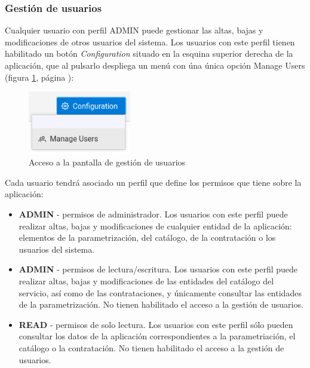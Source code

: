  
 
\subsubsection{Gestión de usuarios}
\label{sub:gestion-usuarios}

Cualquier usuario con perfil ADMIN puede gestionar las altas, bajas y modificaciones de otros usuarios del sistema. Los usuarios con este perfil tienen habilitado un botón \emph{Configuration} situado en la esquina superior derecha de la aplicación, que al pulsarlo despliega un menú con úna única opción Manage Users (figura \ref{fig:boton-gestion-usuarios}, página \pageref{fig:boton-gestion-usuarios}):

\begin{figure}[H]
  \centering
  \includegraphics[width=0.40\textwidth]{imaxes/gestion-usuarios-01.png}
  \caption{Acceso a la pantalla de gestión de usuarios}
  \label{fig:boton-gestion-usuarios}
\end{figure}


Cada usuario tendrá asociado un perfil que define los permisos que tiene sobre la aplicación:

\begin{itemize}
\item \textbf{ADMIN} - permisos de administrador. Los usuarios con este perfil puede realizar altas, bajas y modificaciones de cualquier entidad de la aplicación: elementos de la parametrización, del catálogo, de la contratación o los usuarios del sistema.
\item \textbf{ADMIN} - permisos de lectura/escritura. Los usuarios con este perfil puede realizar altas, bajas y modificaciones de las entidades del catálogo del servicio, así como de las contrataciones, y únicamente consultar las entidades de la parametrización. No tienen habilitado el acceso a la gestión de usuarios.
\item \textbf{READ} - permisos de solo lectura. Los usuarios con este perfil sólo pueden consultar los datos de la aplicación correspondientes a la parametriación, el catálogo o la contratación. No tienen habilitado el acceso a la gestión de usuarios.
\end{itemize}


